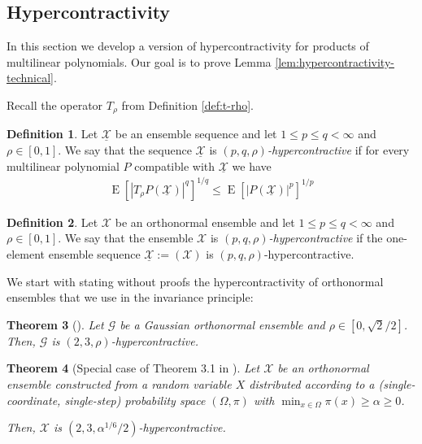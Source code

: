 \documentclass{daj}
\newcommand{\1}{\mathbbm{1}}
\theoremstyle{plain}
\newtheorem{theorem}{Theorem}[section]
\theoremstyle{definition}
\newtheorem{definition}[theorem]{Definition}
\DeclareMathOperator*{\EE}{E}
\begin{document}
\subsection{Hypercontractivity}
\label{sec:hyper}

In this section we develop a version of hypercontractivity for products
of multilinear polynomials. Our goal is to prove Lemma
\ref{lem:hypercontractivity-technical}.

Recall the operator $T_\rho$ from Definition \ref{def:t-rho}.

\begin{definition}
Let $\underline{\mathcal{X}}$ be an ensemble sequence
and let $1 \le p \le q < \infty$ and $\rho \in [0, 1]$.
We say that the sequence $\underline{\mathcal{X}}$ is
\emph{$(p, q, \rho)$-hypercontractive} if for
every multilinear polynomial $P$ compatible with $\underline{\mathcal{X}}$
we have
\begin{align*}
\EE\left[ \left| T_\rho P (\underline{\mathcal{X}}) \right|^q \right]^{1/q}
\le
\EE\left[ \left| P (\underline{\mathcal{X}}) \right|^p \right]^{1/p}
\end{align*}
\end{definition}

\begin{definition}
Let $\mathcal{X}$ be an orthonormal ensemble
and let $1 \le p \le q < \infty$ and $\rho \in [0, 1]$.
We say that the ensemble $\mathcal{X}$ is
\emph{$(p, q, \rho)$-hypercontractive} if
the one-element ensemble sequence
$\underline{\mathcal{X}} := (\mathcal{X})$ is
$(p, q, \rho)$-hypercontractive.
\end{definition}

We start with stating without proofs the hypercontractivity of
orthonormal ensembles that we use in
the invariance principle:

\begin{theorem}[\cite{Bon70, Nel73, Gro75, Bec75}]
\label{thm:hypercontractivity-single-gauss}
Let $\mathcal{G}$ be a Gaussian orthonormal
ensemble and $\rho \in \allowbreak 
[0, \sqrt{2}/2]$. Then,
$\mathcal{G}$ is $(2, 3, \rho)$-hypercontractive.
\end{theorem}

\begin{theorem}[Special case of Theorem 3.1 in \cite{Wol07}]
\label{thm:hypercontractivity-single-discrete}
Let $\mathcal{X}$ be an orthonormal ensemble constructed from a random variable
$X$ distributed according to a 
(single-coordinate, single-step) probability space 
$(\Omega, \pi)$ with 
$\min_{x \in \Omega} \pi(x) \ge \alpha \ge 0$.

Then, $\mathcal{X}$ is $(2, 3, \alpha^{1/6}/2)$-hypercontractive.
\end{theorem}
\end{document}
